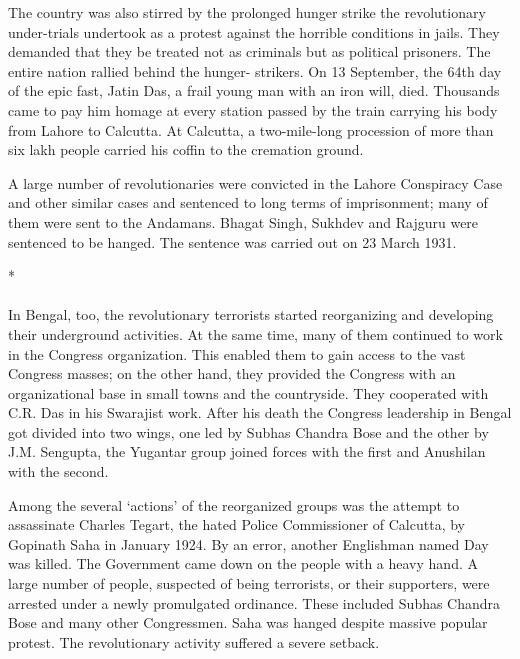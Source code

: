The country was also stirred by the prolonged hunger strike the revolutionary under-trials undertook as a protest against the horrible conditions in jails. They demanded that they be treated not as criminals but as political prisoners. The entire nation rallied behind the hunger- strikers. On 13 September, the 64th day of the epic fast, Jatin Das, a frail young man with an iron will, died. Thousands came to pay him homage at every station passed by the train carrying his body from Lahore to Calcutta. At Calcutta, a two-mile-long procession of more than six lakh people carried his coffin to the cremation ground.

A large number of revolutionaries were convicted in the Lahore Conspiracy Case and other similar cases and sentenced to long terms of imprisonment; many of them were sent to the Andamans. Bhagat Singh, Sukhdev and Rajguru were sentenced to be hanged. The sentence was carried out on 23 March 1931.

\begin{center}*\end{center}

\paragraph*{}


In Bengal, too, the revolutionary terrorists started reorganizing and developing their underground activities. At the same time, many of them continued to work in the Congress organization. This enabled them to gain access to the vast Congress masses; on the other hand, they provided the Congress with an organizational base in small towns and the countryside. They cooperated with C.R. Das in his Swarajist work. After his death the Congress leadership in Bengal got divided into two wings, one led by Subhas Chandra Bose and the other by J.M. Sengupta, the Yugantar group joined forces with the first and Anushilan with the second.

Among the several `actions' of the reorganized groups was the attempt to assassinate Charles Tegart, the hated Police Commissioner of Calcutta, by Gopinath Saha in January 1924. By an error, another Englishman named Day was killed. The Government came down on the people with a heavy hand. A large number of people, suspected of being terrorists, or their supporters, were arrested under a newly promulgated ordinance. These included Subhas Chandra Bose and many other Congressmen. Saha was hanged despite massive popular protest. The revolutionary activity suffered a severe setback.

